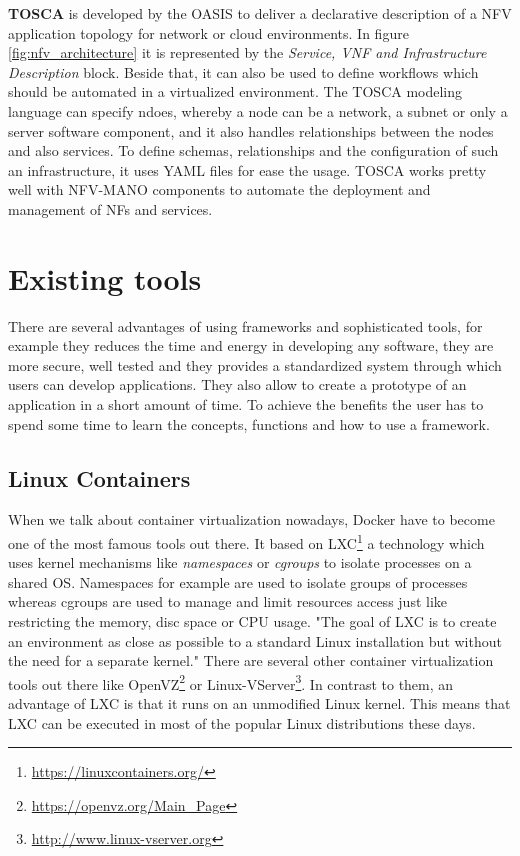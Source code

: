 \textbf{\ac{TOSCA}} is developed by the \ac{OASIS} to deliver a declarative description of a \ac{NFV} application topology for network or cloud environments.\cite[cf.]{Tosca:NFV}
In figure \ref{fig:nfv_architecture} it is represented by the \textit{Service, VNF and Infrastructure Description} block.
Beside that, it can also be used to define workflows which should be automated in a virtualized environment.\cite[cf.]{Tosca:NFV}
The \ac{TOSCA} modeling language can specify ndoes, whereby a node can be a network, a subnet or only a server software component, and it also handles relationships between the nodes and also services.\cite[cf.]{Tosca:NFV}
To define schemas, relationships and the configuration of such an infrastructure, it uses \ac{YAML} files for ease the usage.\cite[cf.]{Tosca:NFV}
\ac{TOSCA} works pretty well with \ac{NFV-MANO} components to automate the deployment and management of \acp{NF} and services.


\section{Existing tools}

There are several advantages of using frameworks and sophisticated tools, for example they reduces the time and energy in developing any software, they are more secure, well tested and they provides a standardized system through which users can develop applications.
They also allow to create a prototype of an application in a short amount of time.
To achieve the benefits the user has to spend some time to learn the concepts, functions and how to use a framework.

\subsection{Linux Containers}
When we talk about container virtualization nowadays, Docker have to become one of the most famous tools out there.
It based on \ac{LXC}\footnote{\url{https://linuxcontainers.org/}} a technology which uses kernel mechanisms like \textit{namespaces} or \textit{cgroups} to isolate processes on a shared \ac{OS}.\cite[cf.][p. 381]{Pahl:2015}
Namespaces for example are used to isolate groups of processes whereas cgroups are used to manage and limit resources access just like restricting the memory, disc space or \ac{CPU} usage.\cite[cf.][p. 381]{Pahl:2015}
"The goal of \ac{LXC} is to create an environment as close as possible to a standard Linux installation but without the need for a separate kernel."\cite[p. 72]{Tosatto:2015}
There are several other container virtualization tools out there like OpenVZ\footnote{\url{https://openvz.org/Main_Page}} or Linux-VServer\footnote{\url{http://www.linux-vserver.org}}.
In contrast to them, an advantage of \ac{LXC} is that it runs on an unmodified Linux kernel.
This means that \ac{LXC} can be executed in most of the popular Linux distributions these days.

